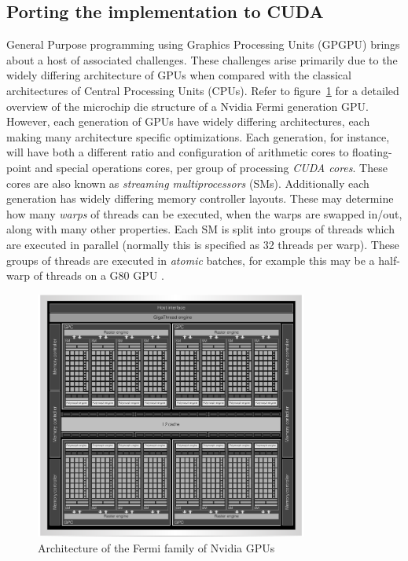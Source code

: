 \subsection{Porting the implementation to CUDA}
General Purpose programming using Graphics Processing Units (GPGPU) brings about a host of associated challenges. These challenges arise primarily due to the widely differing architecture of GPUs when compared
with the classical architectures of Central Processing Units (CPUs). Refer to figure~\ref{FERMI_ARCH} for a detailed overview of the microchip die structure of a Nvidia Fermi generation GPU. 
However, each generation of GPUs have widely differing architectures, each making many architecture specific optimizations. Each generation, for instance, will have both a 
different ratio and configuration of arithmetic cores to floating-point and special operations cores, per group of processing \textit{CUDA cores}. These cores are also known as 
\textit{streaming multiprocessors} (SMs). Additionally each generation has widely differing memory controller layouts. These may determine how many \textit{warps} of threads can be executed, when 
the warps are swapped in/out, along with many other properties. Each SM is split into groups of threads which are executed in parallel (normally this is specified as 32 threads per warp). 
These groups of threads are executed in \emph{atomic} batches, for example this may be a half-warp of threads on a G80 GPU \cite{harris2007parallel}.

\begin{figure}[h!]
\begin{mdframed}
 \centering
 \includegraphics[width=0.8\textwidth]{fermi_arch.png}
 \caption{Architecture of the Fermi family of Nvidia GPUs \cite{wittenbrink2011fermi}}
 \label{FERMI_ARCH}
\end{mdframed}
\end{figure}

